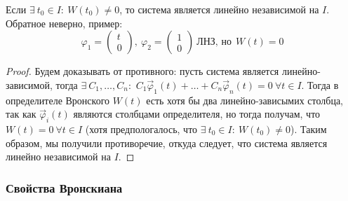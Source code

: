     \begin{theorem}
        Если $\exists ~ t_0 \in I : ~ W(t_0) \neq 0$, то система является линейно независимой на $I$. Обратное неверно,
        пример:
        \begin{equation}
            \varphi_1 = 
            \begin{pmatrix}
                t \\
                0
            \end{pmatrix}, ~
            \varphi_2 = 
            \begin{pmatrix}
                1 \\
                0
            \end{pmatrix} ~ \text{ЛНЗ, но} ~~ W(t) = 0
        \end{equation}
    \end{theorem}

    \begin{proof}
        Будем доказывать от противного: пусть система является линейно-зависимой, тогда $\exists ~ C_1, \dots, C_n:$
        $C_1 \vec \varphi_1(t) + \dots + C_n \vec \varphi_n(t) = 0 ~ \forall t \in I$. Тогда в определителе Вронского $W(t)$
        есть хотя бы два линейно-зависымих столбца, так как $\vec \varphi_i(t)$ являются столбцами определителя, но тогда получам, что
        $W(t) = 0 ~ \forall t \in I$ (хотя предпологалось, что $\exists ~ t_0 \in I : ~ W(t_0) \neq 0$). Таким образом, мы получили противоречие,
        откуда следует, что система является линейно независимой на $I$.
    \end{proof}

    \subsubsection*{Свойства Вронскиана}

